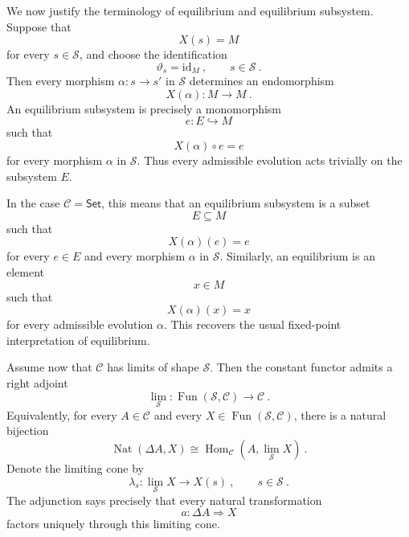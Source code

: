 \documentclass[a4paper,reqno,oneside]{amsart}
\theoremstyle{definition}
\theoremstyle{remark}
\renewcommand{\theta}{\vartheta}
\newcommand{\id}{\mathrm{id}}
\numberwithin{equation}{section}
\begin{document}
	
	We now justify the terminology of equilibrium and equilibrium subsystem.
	Suppose that
	\begin{equation}
		X(s)=M
	\end{equation}
	for every $s\in\mathcal S$, and choose the identification
	\begin{equation}
		\theta_s=\id_M \ ,
		\qquad s\in\mathcal S \ .
	\end{equation}
	Then every morphism $\alpha\colon s\to s'$ in $\mathcal S$ determines an
	endomorphism
	\begin{equation}
		X(\alpha)\colon M\longrightarrow M \ .
	\end{equation}
	An equilibrium subsystem is precisely a monomorphism
	\begin{equation}
		e\colon E\hookrightarrow M
	\end{equation}
	such that
	\begin{equation}
		X(\alpha)\circ e=e
	\end{equation}
	for every morphism $\alpha$ in $\mathcal S$. Thus every admissible evolution
	acts trivially on the subsystem $E$.
	
	In the case $\mathcal C=\mathsf{Set}$, this means that an equilibrium
	subsystem is a subset
	\begin{equation}
		E\subseteq M
	\end{equation}
	such that
	\begin{equation}
		X(\alpha)(e)=e
	\end{equation}
	for every $e\in E$ and every morphism $\alpha$ in $\mathcal S$. Similarly,
	an equilibrium is an element
	\begin{equation}
		x\in M
	\end{equation}
	such that
	\begin{equation}
		X(\alpha)(x)=x
	\end{equation}
	for every admissible evolution $\alpha$. This recovers the usual fixed-point interpretation of equilibrium.
	
	
	\medskip
	
	
	Assume now that $\mathcal C$ has limits of shape $\mathcal S$. Then the
	constant functor admits a right adjoint
	\begin{equation}
		\lim_{\mathcal S}\colon
		\operatorname{Fun}(\mathcal S,\mathcal C)\to\mathcal C \ .
	\end{equation}
	Equivalently, for every $A\in\mathcal C$ and every
	$X\in\operatorname{Fun}(\mathcal S,\mathcal C)$, there is a natural
	bijection
	\begin{equation}
		\operatorname{Nat}(\Delta A,X)
		\cong
		\operatorname{Hom}_{\mathcal C}
		\left(A,\lim_{\mathcal S}X\right) \ .
	\end{equation}
	Denote the limiting cone by
	\begin{equation}
		\lambda_s\colon \lim_{\mathcal S}X\longrightarrow X(s) \ ,
		\qquad s\in\mathcal S \ .
	\end{equation}
	The adjunction says precisely that every natural transformation
	\begin{equation}
		a\colon \Delta A\Longrightarrow X
	\end{equation}
	factors uniquely through this limiting cone.
	
\end{document}
